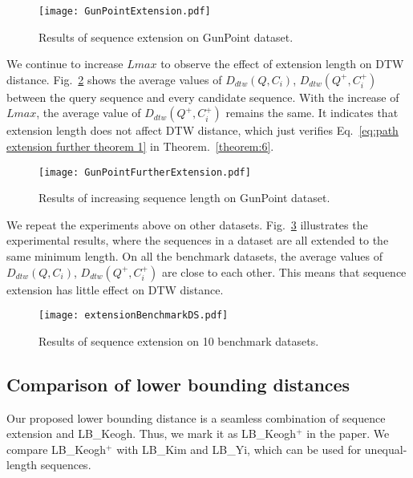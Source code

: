 \documentclass[10pt,journal,compsoc]{IEEEtran}
\begin{document}
\begin{figure}[htbp]
  \centering
  \texttt{[image: GunPointExtension.pdf]}
  \caption{Results of sequence extension on GunPoint dataset.}
  \label{fig:GunPoint extension}
\end{figure}





We continue to increase $Lmax$ to observe the effect of extension length on DTW distance.
Fig.~\ref{fig:GunPoint further extension} shows the average values of $D_{dtw}(Q,C_i)$, $D_{dtw}(Q^+,C^+_i)$
between the query sequence and every candidate sequence.
With the increase of $Lmax$,
the average value of $D_{dtw}(Q^+,C^+_i)$ remains the same.
It indicates that extension length does not affect DTW distance,
which just verifies Eq.~\eqref{eq:path extension further theorem 1} in Theorem.~\ref{theorem:6}.

\begin{figure}[htbp]
  \centering
  \texttt{[image: GunPointFurtherExtension.pdf]}
  \caption{Results of increasing sequence length on GunPoint dataset.}
  \label{fig:GunPoint further extension}
\end{figure}


We repeat the experiments above on other datasets.
Fig.~\ref{fig:benchmark datasets further extension} illustrates the experimental results,
where the sequences in a dataset are all extended to the same minimum length.
On all the benchmark datasets,
the average values of $D_{dtw}(Q,C_i)$, $D_{dtw}(Q^+,C^+_i)$ are close to each other.
This means that sequence extension has little effect on DTW distance.

\begin{figure}[htbp]
  \centering
  \texttt{[image: extensionBenchmarkDS.pdf]}
  \caption{Results of sequence extension on 10 benchmark datasets.}
  \label{fig:benchmark datasets further extension}
\end{figure}


\subsection{Comparison of lower bounding distances}


Our proposed lower bounding distance is a seamless combination of sequence extension and LB\_Keogh.
Thus, we mark it as LB\_Keogh$^+$ in the paper.
We compare LB\_Keogh$^+$ with LB\_Kim and LB\_Yi,
which can be used for unequal-length sequences.
\end{document}
